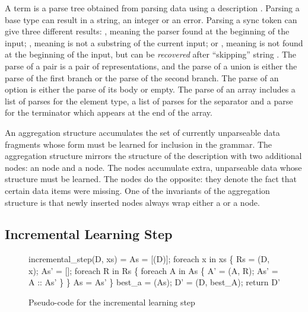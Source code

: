A term  is a parse tree obtained from parsing 
data using a description .  Parsing a base type can result in a
string, an integer or an error.  Parsing a sync token
 can give three different results: , meaning the
parser found  at the beginning of the input; , meaning
 is not a substring of the current input; or ,
meaning  is not found at the beginning of the input, but
can be {\em recovered} after ``skipping'' string .  The parse
of a pair is a pair of representations, and the parse of a union is
either the parse of the first branch or the parse of the second
branch. The parse of an option is either the parse of its body or  empty.
The parse of an array includes a list of parses for the
element type, a list of parses for the separator and a parse for the
terminator which appears at the end of the array.

An aggregation structure accumulates the set of currently
unparseable data fragments whose form must be learned
for inclusion in the grammar.
The aggregation structure mirrors the structure of the description  
with two additional nodes: an  node and a  node. 
The  nodes accumulate extra, unparseable data 
whose structure must be learned.
The  nodes do the opposite: they denote the fact that
certain data items were missing.  One of the invariants 
of the aggregation structure is that
newly inserted  nodes always wrap either a  or 
a  node.


\subsection{Incremental Learning Step}
\begin{figure}[t]
\begin{codebox}
incremental_step(D, xs) =
  As = [(D)];
  foreach x in xs \{
    Rs = (D, x);
    As' = [];
    foreach R in Rs \{
      foreach A in As \{
        A' = (A, R); 
        As' = A :: As'
      \}
    \}
    As = As'
  \} 
  best_a = (As);
  D' = (D, best_A);  
  return D'
\end{codebox}
\caption{Pseudo-code for the incremental learning step}
\label{fig:inc-learning}
\end{figure}

